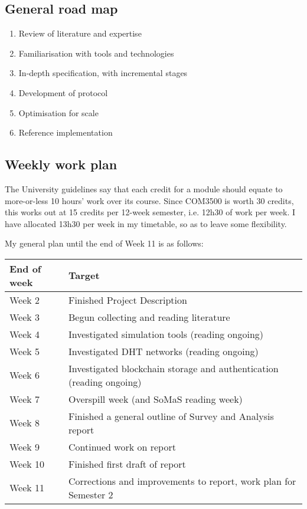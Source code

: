\documentclass{article}
\begin{document}
\subsection{General road map}
\begin{enumerate}
\item Review of literature and expertise
\item Familiarisation with tools and technologies
\item In-depth specification, with incremental stages
\item Development of protocol
\item Optimisation for scale
\item Reference implementation
\end{enumerate}

\subsection{Weekly work plan}
The University guidelines say that each credit for a module should equate to more-or-less 10 hours' work over its course.  Since COM3500 is worth 30 credits, this works out at 15 credits per 12-week semester, i.e. 12h30 of work per week.  I have allocated 13h30 per week in my timetable, so as to leave some flexibility.

My general plan until the end of Week 11 is as follows:

\begin{table}[H]
  \centering
  \begin{tabular}{l l}
\textbf{End of week} & Target \\ \hline
Week 2               & Finished Project Description \\
Week 3               & Begun collecting and reading literature \\
Week 4               & Investigated simulation tools (reading ongoing) \\
Week 5               & Investigated DHT networks (reading ongoing) \\
Week 6               & Investigated blockchain storage and authentication (reading ongoing) \\
Week 7               & Overspill week (and SoMaS reading week) \\
Week 8               & Finished a general outline of Survey and Analysis report \\
Week 9               & Continued work on report \\
Week 10              & Finished first draft of report \\
Week 11              & Corrections and improvements to report, work plan for Semester 2 \\
  \end{tabular}
\end{table}
\end{document}
